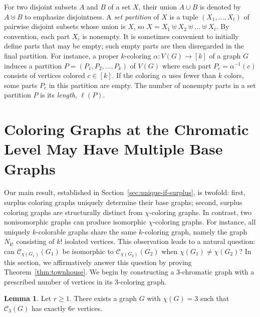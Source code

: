 \documentclass{amsart}
\theoremstyle{hypothesisstyle}
\theoremstyle{definition}
\newtheorem{lemma}[theorem]{Lemma}
\theoremstyle{remark}
\numberwithin{equation}{section}
\begin{document}
For two disjoint subsets $A$ and $B$ of a set $X$, their union $A\cup B$ is denoted by $A\uplus B$ to emphasize disjointness. A \emph{set partition} of $X$ is a tuple $(X_1, \dots, X_t)$ of pairwise disjoint subsets whose union is $X$, so $X=X_1\uplus X_2\uplus \dots \uplus X_t$. By convention, each part $X_i$ is nonempty. It is sometimes convenient to initially define parts that may be empty; such empty parts are then disregarded in the final partition. For instance, a proper $k$-coloring $\alpha\colon V(G)\to [k]$ of a graph $G$ induces a partition $P=(P_1, P_2, \dots, P_k)$ of $V(G)$ where each part $P_c=\alpha^{-1}(c)$ consists of vertices colored $c\in [k]$. If the coloring $\alpha$ uses fewer than $k$ colors, some parts $P_c$ in this partition are empty. The number of nonempty parts in a set partition $P$ is its \emph{length}, $\ell(P)$.

\section{Coloring Graphs at the Chromatic Level May Have Multiple Base Graphs}\label{sec:chromatic-level}

Our main result, established in Section~\ref{sec:unique-if-surplus}, is twofold: first, surplus coloring graphs uniquely determine their base graphs; second, surplus coloring graphs are structurally distinct from $\chi$-coloring graphs. In contrast, two nonisomorphic graphs can produce isomorphic $\chi$-coloring graphs. For instance, all uniquely $k$-colorable graphs share the same $k$-coloring graph, namely the graph $N_{k!}$ consisting of $k!$ isolated vertices. This observation leads to a natural question: can $\mathcal{C}_{\chi(G_1)}(G_1)$ be isomorphic to $\mathcal{C}_{\chi(G_2)}(G_2)$ when $\chi(G_1) \neq \chi(G_2)$? In this section, we affirmatively answer this question by proving Theorem~\ref{thm:townhouse}. We begin by constructing a $3$-chromatic graph with a prescribed number of vertices in its $3$-coloring graph.

\begin{lemma}\label{lem:townhouse} Let $r\geq 1$. There exists a graph $G$ with $\chi(G)=3$ such that $\mathcal{C}_3(G)$ has exactly $6r$ vertices.
\end{lemma}
\end{document}
